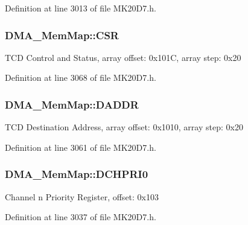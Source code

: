 Definition at line 3013 of file M\+K20\+D7.\+h.

\subsubsection[{\texorpdfstring{C\+SR}{CSR}}]{ D\+M\+A\+\_\+\+Mem\+Map\+::\+C\+SR}\hypertarget{struct_d_m_a___mem_map_a3acaffbe8a6ec6cf0ba28d9e77a52aca}{}\label{struct_d_m_a___mem_map_a3acaffbe8a6ec6cf0ba28d9e77a52aca}
T\+CD Control and Status, array offset\+: 0x101C, array step\+: 0x20 

Definition at line 3068 of file M\+K20\+D7.\+h.

\subsubsection[{\texorpdfstring{D\+A\+D\+DR}{DADDR}}]{ D\+M\+A\+\_\+\+Mem\+Map\+::\+D\+A\+D\+DR}\hypertarget{struct_d_m_a___mem_map_ae2b0e842221342f28893b3399e17cf82}{}\label{struct_d_m_a___mem_map_ae2b0e842221342f28893b3399e17cf82}
T\+CD Destination Address, array offset\+: 0x1010, array step\+: 0x20 

Definition at line 3061 of file M\+K20\+D7.\+h.

\subsubsection[{\texorpdfstring{D\+C\+H\+P\+R\+I0}{DCHPRI0}}]{ D\+M\+A\+\_\+\+Mem\+Map\+::\+D\+C\+H\+P\+R\+I0}\hypertarget{struct_d_m_a___mem_map_a9ce85f6eadec6796348eea898eb0dff4}{}\label{struct_d_m_a___mem_map_a9ce85f6eadec6796348eea898eb0dff4}
Channel n Priority Register, offset\+: 0x103 

Definition at line 3037 of file M\+K20\+D7.\+h.

